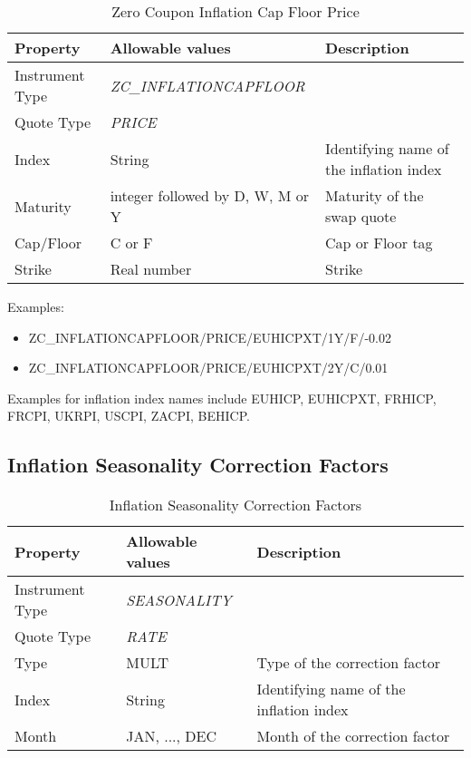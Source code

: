 \begin{table}[H]
    \centering
    \begin{tabular}{|p{3cm}|p{3.5cm}|p{7cm}|}
      \hline
      {\bf Property} & {\bf Allowable values} & {\bf Description} \\ \hline
      Instrument Type & \emph{ZC\_INFLATIONCAPFLOOR} & \\ \hline
      Quote Type & \emph{PRICE} & \\ \hline
      Index & String & Identifying name of the inflation index \\ \hline
      Maturity & integer followed by D, W, M or Y & Maturity of the swap quote \\ \hline
      Cap/Floor & C or F & Cap or Floor tag \\ \hline
      Strike & Real number & Strike \\ \hline
    \end{tabular}
    \caption{Zero Coupon Inflation Cap Floor Price}
    \label{tab:zcinflationcapfloorprice_quote}
\end{table}

\medskip
Examples:
\begin{itemize}
\item {ZC\_INFLATIONCAPFLOOR/PRICE/EUHICPXT/1Y/F/-0.02}
\item {ZC\_INFLATIONCAPFLOOR/PRICE/EUHICPXT/2Y/C/0.01}
\end{itemize}

Examples for inflation index names include EUHICP, EUHICPXT, FRHICP, FRCPI, UKRPI, USCPI, ZACPI, BEHICP.

\subsection{Inflation Seasonality Correction Factors}

\begin{table}[H]
    \centering
    \begin{tabular}{|p{3cm}|p{3.5cm}|p{7cm}|}
      \hline
      {\bf Property} & {\bf Allowable values} & {\bf Description} \\ \hline
      Instrument Type & \emph{SEASONALITY} & \\ \hline
      Quote Type & \emph{RATE} & \\ \hline
      Type & MULT & Type of the correction factor \\ \hline
      Index & String & Identifying name of the inflation index \\ \hline
      Month & JAN, ..., DEC & Month of the correction factor \\ \hline
    \end{tabular}
    \caption{Inflation Seasonality Correction Factors}
    \label{tab:inflationseasonality_quote}
\end{table}

